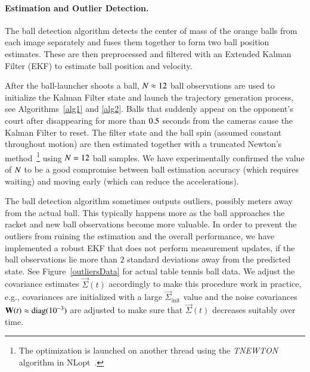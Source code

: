 \paragraph{\textbf{Estimation and Outlier Detection}.} The ball detection algorithm detects the center of mass of the orange balls from each image separately and fuses them together to form two ball position estimates. These are then preprocessed and filtered with an Extended Kalman Filter (EKF) to estimate ball position and velocity. 

After the ball-launcher shoots a ball, $N \approx 12$ ball observations are used to initialize the Kalman Filter state and launch the trajectory generation process, see Algorithms~\ref{alg1} and \ref{alg2}. Balls that suddenly appear on the opponent's court after disappearing for more than $0.5$ seconds from the cameras cause the Kalman Filter to reset. The filter state and the ball spin (assumed constant throughout motion) are then estimated together with a truncated Newton's method~\footnote{The optimization is launched on another thread using the \emph{TNEWTON} algorithm in NLopt~\citep{NLopt}.} using $N = 12$ ball samples. We have experimentally confirmed the value of $N$ to be a good compromise between ball estimation accuracy (which requires waiting) and moving early (which can reduce the accelerations).

The ball detection algorithm sometimes outputs outliers, possibly meters away from the actual ball. This typically happens more as the ball approaches the racket and new ball observations become more valuable. In order to prevent the outliers from ruining the estimation and the overall performance, we have implemented a robust EKF that does not perform measurement updates, if the ball observations lie more than $2$ standard deviations away from the predicted state. See Figure~\ref{outliersData} for actual table tennis ball data.
%
%
We adjust the covariance estimates $\vec{\Sigma}(t)$ accordingly to make this procedure work in practice, e.g., covariances are initialized with a large $\vec{\Sigma}_{\mathrm{init}}$ value and the noise covariances $\boldsymbol{\mathrm{W}}(t) \approx \mathop{\rm diag}(10^{-3})$ are adjusted to make sure that $\vec{\Sigma}(t)$ decreases suitably over time.
%
%
%
